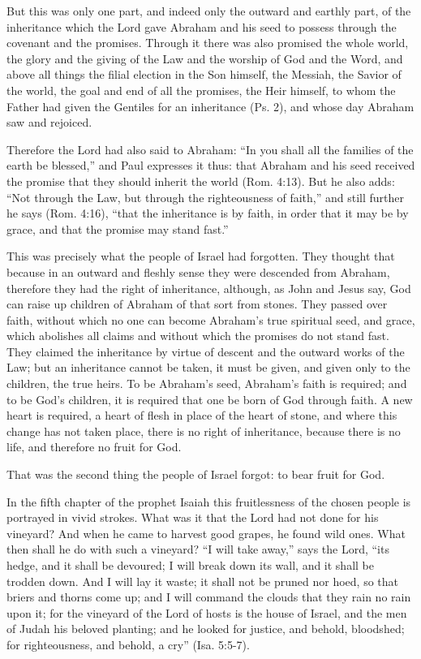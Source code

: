 But this was only one part, and indeed only the outward and earthly part, of the inheritance which the Lord gave Abraham and his seed to possess through the covenant and the promises. Through it there was also promised the whole world, the glory and the giving of the Law and the worship of God and the Word, and above all things the filial election in the Son himself, the Messiah, the Savior of the world, the goal and end of all the promises, the Heir himself, to whom the Father had given the Gentiles for an inheritance (Ps. 2), and whose day Abraham saw and rejoiced.

Therefore the Lord had also said to Abraham: “In you shall all the families of the earth be blessed,” and Paul expresses it thus: that Abraham and his seed received the promise that they should inherit the world (Rom. 4:13). But he also adds: “Not through the Law, but through the righteousness of faith,” and still further he says (Rom. 4:16), “that the inheritance is by faith, in order that it may be by grace, and that the promise may stand fast.”

This was precisely what the people of Israel had forgotten. They thought that because in an outward and fleshly sense they were descended from Abraham, therefore they had the right of inheritance, although, as John and Jesus say, God can raise up children of Abraham of that sort from stones. They passed over faith, without which no one can become Abraham’s true spiritual seed, and grace, which abolishes all claims and without which the promises do not stand fast. They claimed the inheritance by virtue of descent and the outward works of the Law; but an inheritance cannot be taken, it must be given, and given only to the children, the true heirs. To be Abraham’s seed, Abraham’s faith is required; and to be God’s children, it is required that one be born of God through faith. A new heart is required, a heart of flesh in place of the heart of stone, and where this change has not taken place, there is no right of inheritance, because there is no life, and therefore no fruit for God.

That was the second thing the people of Israel forgot: to bear fruit for God.

In the fifth chapter of the prophet Isaiah this fruitlessness of the chosen people is portrayed in vivid strokes. What was it that the Lord had not done for his vineyard? And when he came to harvest good grapes, he found wild ones. What then shall he do with such a vineyard? “I will take away,” says the Lord, “its hedge, and it shall be devoured; I will break down its wall, and it shall be trodden down. And I will lay it waste; it shall not be pruned nor hoed, so that briers and thorns come up; and I will command the clouds that they rain no rain upon it; for the vineyard of the Lord of hosts is the house of Israel, and the men of Judah his beloved planting; and he looked for justice, and behold, bloodshed; for righteousness, and behold, a cry” (Isa. 5:5-7).

